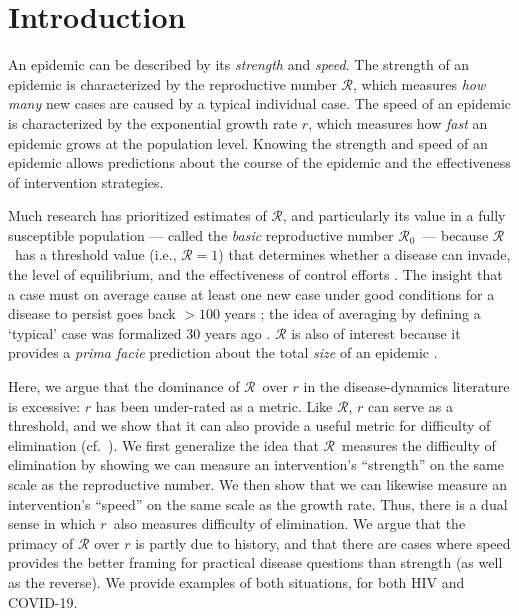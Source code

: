 \documentclass[12pt]{article}
\newcommand{\Rx}[1]{\ensuremath{{\mathcal R}_{#1}}}
\newcommand{\Ro}{\Rx{0}}
\newcommand{\RR}{\ensuremath{{\mathcal R}}}
\newcommand{\rr}{\ensuremath{{r}}}
\begin{document}
\pagebreak

\section{Introduction}

An epidemic can be described by its \emph{strength} and \emph{speed}.
The strength of an epidemic is characterized by the reproductive number \RR, which measures \emph{how many} new cases are caused by a typical individual case.
The speed of an epidemic is characterized by the exponential growth rate $r$, which measures how \emph{fast} an epidemic grows at the population level.
Knowing the strength and speed of an epidemic allows predictions about the course of the epidemic and the effectiveness of intervention strategies.

Much research has prioritized estimates of \RR, and particularly its value in a fully susceptible population --- called the \emph{basic} reproductive number \Ro\, --- because \RR\ has a threshold value (i.e., $\RR=1$) that determines whether a disease can invade, the level of equilibrium, and the effectiveness of control efforts \citep{anderson1991infectious, diekmann1990definition}.
The insight that a case must on average cause at least one new case under good conditions for a disease to persist goes back $>100$ years \citep{ross1911prevention};
the idea of averaging by defining a `typical' case was formalized 30 years ago \citep{diekmann1990definition}.
$\RR$ is also of interest because it provides a \emph{prima facie} prediction about the total \emph{size} of an epidemic \citep{anderson1991infectious, ma2006generality, arino2007final, andreasen2011final, miller2012note}.

Here, we argue that the dominance of \RR\ over $r$ in the disease-dynamics literature is excessive: $r$ has been under-rated as a metric. Like \RR,  $r$ can serve as a threshold, and we show that it can also provide a useful metric for difficulty of elimination (cf.~\cite{ferretti2020quantifying}). 
We first generalize the idea that \RR\ measures the difficulty of elimination by showing we can measure an intervention's ``strength'' on the same scale as the reproductive number. 
We then show that we can likewise measure an intervention's ``speed'' on the same scale as the growth rate.
Thus, there is a dual sense in which \rr\ also measures difficulty of elimination. 
We argue that the primacy of $\RR$ over $r$ is partly due to history, and that there are cases where speed provides the better framing for practical disease questions than strength (as well as the reverse). We provide examples of both situations, for both HIV and COVID-19.
\end{document}
